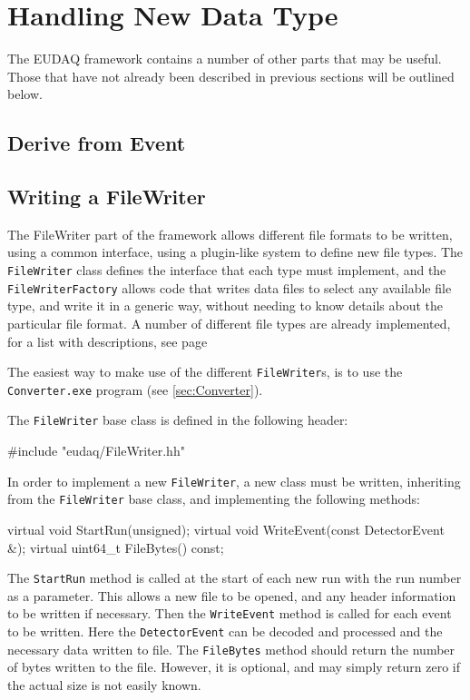 \section{Handling New Data Type}\label{sec:NewDataHandling}
The EUDAQ framework contains a number of other parts that may be useful.
Those that have not already been described in previous sections will be outlined below.

\subsection{Derive from Event}


\subsection{Writing a FileWriter}\label{sec:FileWriterWriting}
The FileWriter part of the framework allows different file formats to be written,
using a common interface, using a plugin-like system to define new file types.
The \texttt{FileWriter} class defines the interface that each type must implement,
and the \texttt{FileWriterFactory} allows code that writes data files to select any
available file type, and write it in a generic way,
without needing to know details about the particular file format.
A number of different file types are already implemented,
for a list with descriptions, see page \pageref{lst:FileTypes}

The easiest way to make use of the different \texttt{FileWriter}s,
is to use the \texttt{Converter.exe} program (see \autoref{sec:Converter}).

The \texttt{FileWriter} base class is defined in the following header:
\begin{listing}
#include "eudaq/FileWriter.hh"
\end{listing}

In order to implement a new \texttt{FileWriter}, a new class must be written,
inheriting from the \texttt{FileWriter} base class, and implementing the following methods:
\begin{listing}
virtual void StartRun(unsigned);
virtual void WriteEvent(const DetectorEvent &);
virtual uint64_t FileBytes() const;
\end{listing}

The \texttt{StartRun} method is called at the start of each new run
with the run number as a parameter.
This allows a new file to be opened, and any header information to be written if necessary.
Then the \texttt{WriteEvent} method is called for each event to be written.
Here the \texttt{DetectorEvent} can be decoded and processed
and the necessary data written to file.
The \texttt{FileBytes} method should return the number of bytes written to the file.
However, it is optional, and may simply return zero if the actual size is not easily known.

